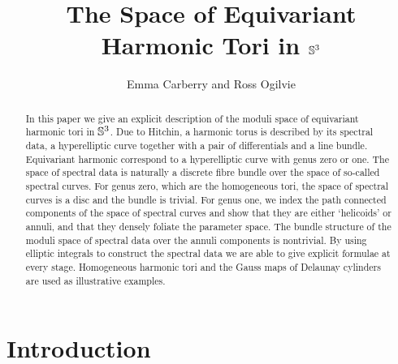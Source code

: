 \documentclass{article}
\begin{document}
\title{The Space of Equivariant Harmonic Tori in $\S^3$}
\author{Emma Carberry and Ross Ogilvie}
\maketitle

\begin{abstract}
In this paper we give an explicit description of the moduli space of equivariant harmonic tori in $\S^3$. 
Due to Hitchin, a harmonic torus is described by its spectral data, a hyperelliptic curve together with a pair of differentials and a line bundle. Equivariant harmonic correspond to a hyperelliptic curve with genus zero or one. The space of spectral data is naturally a discrete fibre bundle over the space of so-called spectral curves.
For genus zero, which are the homogeneous tori, the space of spectral curves is a disc and the bundle is trivial.
For genus one, we index the path connected components of the space of spectral curves and show that they are either `helicoids' or annuli, and that they densely foliate the parameter space. The bundle structure of the moduli space of spectral data over the annuli components is nontrivial.
By using elliptic integrals to construct the spectral data we are able to give explicit formulae at every stage.
Homogeneous harmonic tori and the Gauss maps of Delaunay cylinders are used as illustrative examples.
\end{abstract}

\section{Introduction}\label{sec:Introduction}
\end{document}
